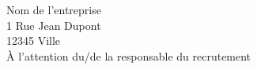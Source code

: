 
\begin{flushright}
Nom de l'entreprise \\
1 Rue Jean Dupont \\
12345 Ville \\
À l'attention du/de la responsable du recrutement \\
\end{flushright}